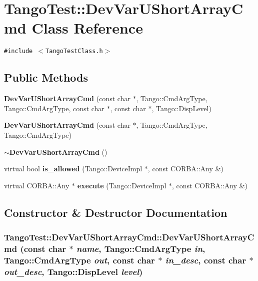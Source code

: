 \section{Tango\-Test::Dev\-Var\-UShort\-Array\-Cmd  Class Reference}
\label{classTangoTest_1_1DevVarUShortArrayCmd}
{\tt \#include $<$Tango\-Test\-Class.h$>$}

\subsection*{Public Methods}
\begin{CompactItemize}
\item 
{\bf Dev\-Var\-UShort\-Array\-Cmd} (const char $\ast$, Tango::Cmd\-Arg\-Type, Tango::Cmd\-Arg\-Type, const char $\ast$, const char $\ast$, Tango::Disp\-Level)
\item 
{\bf Dev\-Var\-UShort\-Array\-Cmd} (const char $\ast$, Tango::Cmd\-Arg\-Type, Tango::Cmd\-Arg\-Type)
\item 
{\bf $\sim$Dev\-Var\-UShort\-Array\-Cmd} ()
\item 
virtual bool {\bf is\_\-allowed} (Tango::Device\-Impl $\ast$, const CORBA::Any \&)
\item 
virtual CORBA::Any $\ast$ {\bf execute} (Tango::Device\-Impl $\ast$, const CORBA::Any \&)
\end{CompactItemize}


\subsection{Constructor \& Destructor Documentation}
\subsubsection{\setlength{\rightskip}{0pt plus 5cm}Tango\-Test::Dev\-Var\-UShort\-Array\-Cmd::Dev\-Var\-UShort\-Array\-Cmd (const char $\ast$ {\em name}, Tango::Cmd\-Arg\-Type {\em in}, Tango::Cmd\-Arg\-Type {\em out}, const char $\ast$ {\em in\_\-desc}, const char $\ast$ {\em out\_\-desc}, Tango::Disp\-Level {\em level})}\label{classTangoTest_1_1DevVarUShortArrayCmd_a0}


